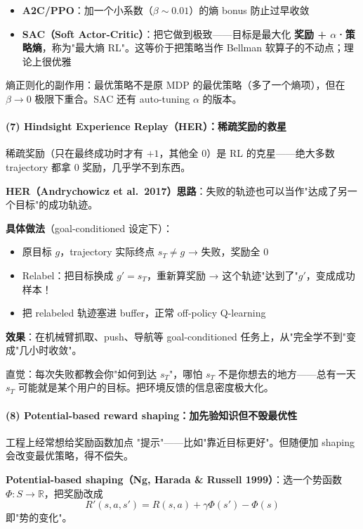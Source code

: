 \documentclass[11pt,a4paper]{article}
\theoremstyle{definition}
\begin{document}
\begin{itemize}
\item \textbf{A2C/PPO}：加一个小系数（$\beta \sim 0.01$）的熵 bonus 防止过早收敛
\item \textbf{SAC（Soft Actor-Critic）}：把它做到极致——目标是最大化 \textbf{奖励 + $\alpha$·策略熵}，称为"最大熵 RL"。这等价于把策略当作 Bellman 软算子的不动点；理论上很优雅
\end{itemize}

熵正则化的副作用：最优策略不是原 MDP 的最优策略（多了一个熵项），但在 $\beta \to 0$ 极限下重合。SAC 还有 auto-tuning $\alpha$ 的版本。

\paragraph{(7) Hindsight Experience Replay（HER）：稀疏奖励的救星}

稀疏奖励（只在最终成功时才有 $+1$，其他全 $0$）是 RL 的克星——绝大多数 trajectory 都拿 $0$ 奖励，几乎学不到东西。

\textbf{HER（Andrychowicz et al.\ 2017）思路}：失败的轨迹也可以当作"达成了另一个目标"的成功轨迹。

\textbf{具体做法}（goal-conditioned 设定下）：
\begin{itemize}
\item 原目标 $g$，trajectory 实际终点 $s_T \neq g$ → 失败，奖励全 $0$
\item Relabel：把目标换成 $g' = s_T$，重新算奖励 → 这个轨迹"达到了"$g'$，变成成功样本！
\item 把 relabeled 轨迹塞进 buffer，正常 off-policy Q-learning
\end{itemize}

\textbf{效果}：在机械臂抓取、push、导航等 goal-conditioned 任务上，从"完全学不到"变成"几小时收敛"。

直觉：每次失败都教会你"如何到达 $s_T$"，哪怕 $s_T$ 不是你想去的地方——总有一天 $s_T$ 可能就是某个用户的目标。把环境反馈的信息密度极大化。

\paragraph{(8) Potential-based reward shaping：加先验知识但不毁最优性}

工程上经常想给奖励函数加点 "提示"——比如"靠近目标更好"。但随便加 shaping 会改变最优策略，得不偿失。

\textbf{Potential-based shaping（Ng, Harada \& Russell 1999）}：选一个势函数 $\Phi: S \to \mathbb{R}$，把奖励改成
\[
R'(s, a, s') = R(s, a) + \gamma \Phi(s') - \Phi(s)
\]
即"势的变化"。
\end{document}
